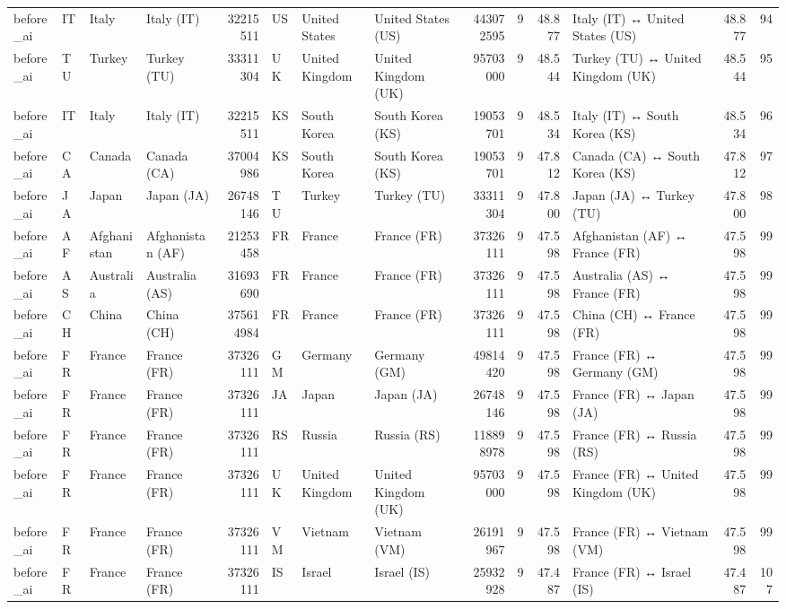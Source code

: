 \begin{tabular}{llllrlllrrrlrr}
before\_ai & IT & Italy & Italy (IT) & 32215511 & US & United States & United States (US) & 443072595 & 9 & 48.877 & Italy (IT) ↔ United States (US) & 48.877 & 94 \\
before\_ai & TU & Turkey & Turkey (TU) & 33311304 & UK & United Kingdom & United Kingdom (UK) & 95703000 & 9 & 48.544 & Turkey (TU) ↔ United Kingdom (UK) & 48.544 & 95 \\
before\_ai & IT & Italy & Italy (IT) & 32215511 & KS & South Korea & South Korea (KS) & 19053701 & 9 & 48.534 & Italy (IT) ↔ South Korea (KS) & 48.534 & 96 \\
before\_ai & CA & Canada & Canada (CA) & 37004986 & KS & South Korea & South Korea (KS) & 19053701 & 9 & 47.812 & Canada (CA) ↔ South Korea (KS) & 47.812 & 97 \\
before\_ai & JA & Japan & Japan (JA) & 26748146 & TU & Turkey & Turkey (TU) & 33311304 & 9 & 47.800 & Japan (JA) ↔ Turkey (TU) & 47.800 & 98 \\
before\_ai & AF & Afghanistan & Afghanistan (AF) & 21253458 & FR & France & France (FR) & 37326111 & 9 & 47.598 & Afghanistan (AF) ↔ France (FR) & 47.598 & 99 \\
before\_ai & AS & Australia & Australia (AS) & 31693690 & FR & France & France (FR) & 37326111 & 9 & 47.598 & Australia (AS) ↔ France (FR) & 47.598 & 99 \\
before\_ai & CH & China & China (CH) & 375614984 & FR & France & France (FR) & 37326111 & 9 & 47.598 & China (CH) ↔ France (FR) & 47.598 & 99 \\
before\_ai & FR & France & France (FR) & 37326111 & GM & Germany & Germany (GM) & 49814420 & 9 & 47.598 & France (FR) ↔ Germany (GM) & 47.598 & 99 \\
before\_ai & FR & France & France (FR) & 37326111 & JA & Japan & Japan (JA) & 26748146 & 9 & 47.598 & France (FR) ↔ Japan (JA) & 47.598 & 99 \\
before\_ai & FR & France & France (FR) & 37326111 & RS & Russia & Russia (RS) & 118898978 & 9 & 47.598 & France (FR) ↔ Russia (RS) & 47.598 & 99 \\
before\_ai & FR & France & France (FR) & 37326111 & UK & United Kingdom & United Kingdom (UK) & 95703000 & 9 & 47.598 & France (FR) ↔ United Kingdom (UK) & 47.598 & 99 \\
before\_ai & FR & France & France (FR) & 37326111 & VM & Vietnam & Vietnam (VM) & 26191967 & 9 & 47.598 & France (FR) ↔ Vietnam (VM) & 47.598 & 99 \\
before\_ai & FR & France & France (FR) & 37326111 & IS & Israel & Israel (IS) & 25932928 & 9 & 47.487 & France (FR) ↔ Israel (IS) & 47.487 & 107 \\

\end{tabular}

